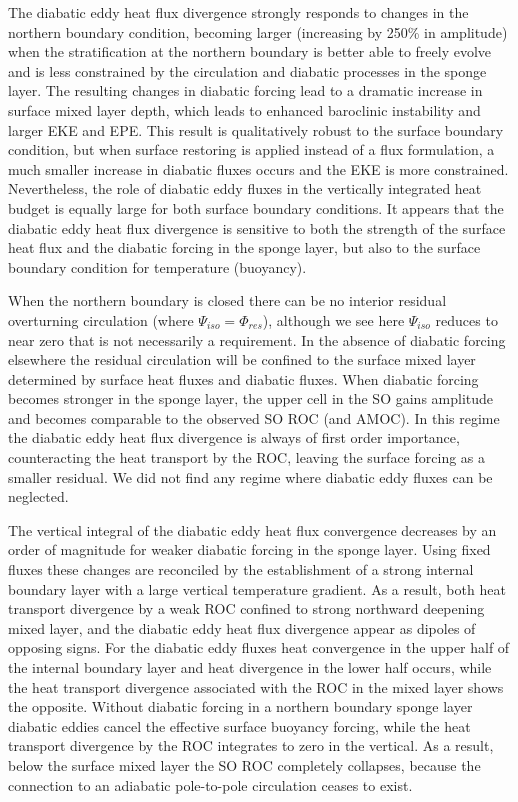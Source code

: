 The diabatic eddy heat flux divergence strongly responds to changes in the northern boundary condition, becoming larger (increasing by 250\% in amplitude) when the stratification at the northern boundary is better able to freely evolve and is less constrained by the circulation and diabatic processes in the sponge layer. The resulting changes in diabatic forcing lead to a dramatic increase in surface mixed layer depth, which leads to enhanced baroclinic instability and larger EKE and EPE. This result is qualitatively robust to the surface boundary condition, but when surface restoring is applied instead of a flux formulation, a much smaller increase in diabatic fluxes occurs and the EKE is more constrained. Nevertheless, the role of diabatic eddy fluxes in the vertically integrated heat budget is equally large for both surface boundary conditions. It appears that the diabatic eddy heat flux divergence is sensitive to both the strength of the surface heat flux and the diabatic forcing in the sponge layer, but also to the surface boundary condition for temperature (buoyancy).

When the northern boundary is closed there can be no interior residual overturning circulation (where $\Psi _{iso} = \Phi _{res}$), although we see here $\Psi _{iso}$ reduces to near zero that is not necessarily a requirement. In the absence of diabatic forcing elsewhere the residual circulation will be confined to the surface mixed layer determined by surface heat fluxes and diabatic fluxes. When diabatic forcing becomes stronger in the sponge layer, the upper cell in the SO gains amplitude and becomes comparable to the observed SO ROC (and AMOC). In this regime the diabatic eddy heat flux divergence is always of first order importance, counteracting the heat transport by the ROC, leaving the surface forcing as a smaller residual. We did not find any regime where diabatic eddy fluxes can be neglected. 

The vertical integral of the diabatic eddy heat flux convergence decreases by an order of magnitude for weaker diabatic forcing in the sponge layer. Using fixed fluxes these changes are reconciled by the establishment of a strong internal boundary layer with a large vertical temperature gradient. 
As a result, both heat transport divergence by a weak ROC confined to strong northward deepening mixed layer, and the diabatic eddy heat flux divergence appear as dipoles of opposing signs. For the diabatic eddy fluxes heat convergence in the upper half of the internal boundary layer and heat divergence in the lower half occurs, while the heat transport divergence associated with the ROC in the mixed layer shows the opposite.
Without diabatic forcing in a northern boundary sponge layer diabatic eddies cancel the effective surface buoyancy forcing, while the heat transport divergence by the ROC integrates to zero in the vertical. As a result, below the surface mixed layer the SO ROC completely collapses, because  the connection to an adiabatic pole-to-pole circulation ceases to exist. 

